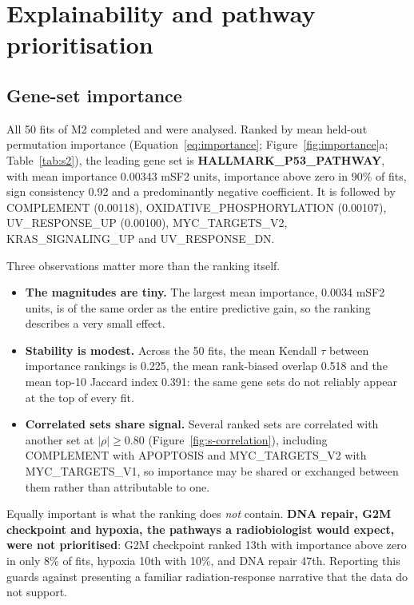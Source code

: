 \chapter{Explainability and pathway prioritisation}\label{ch:explainability}

\section{Gene-set importance}\label{sec:importance}

All 50 fits of M2 completed and were analysed. Ranked by mean held-out permutation importance
(Equation~\ref{eq:importance}; Figure~\ref{fig:importance}a; Table~\ref{tab:s2}), the leading
gene set is \textbf{HALLMARK\_P53\_PATHWAY}, with mean importance 0.00343 mSF2 units,
importance above zero in 90\% of fits, sign consistency 0.92 and a predominantly negative
coefficient. It is followed by COMPLEMENT (0.00118), OXIDATIVE\_PHOSPHORYLATION (0.00107),
UV\_RESPONSE\_UP (0.00100), MYC\_TARGETS\_V2, KRAS\_SIGNALING\_UP and UV\_RESPONSE\_DN.

Three observations matter more than the ranking itself.
\begin{itemize}
  \item \textbf{The magnitudes are tiny.} The largest mean importance, 0.0034 mSF2 units, is
    of the same order as the entire predictive gain, so the ranking describes a very small
    effect.
  \item \textbf{Stability is modest.} Across the 50 fits, the mean Kendall $\tau$ between
    importance rankings is 0.225, the mean rank-biased overlap 0.518 and the mean top-10
    Jaccard index 0.391: the same gene sets do not reliably appear at the top of every fit.
  \item \textbf{Correlated sets share signal.} Several ranked sets are correlated with
    another set at $\lvert\rho\rvert\ge0.80$ (Figure~\ref{fig:s-correlation}), including
    COMPLEMENT with APOPTOSIS and MYC\_TARGETS\_V2 with MYC\_TARGETS\_V1, so importance may
    be shared or exchanged between them rather than attributable to one.
\end{itemize}

Equally important is what the ranking does \emph{not} contain. \textbf{DNA repair, G2M
checkpoint and hypoxia, the pathways a radiobiologist would expect, were not prioritised}:
G2M checkpoint ranked 13th with importance above zero in only 8\% of fits, hypoxia 10th with
10\%, and DNA repair 47th. Reporting this guards against presenting a familiar
radiation-response narrative that the data do not support.

